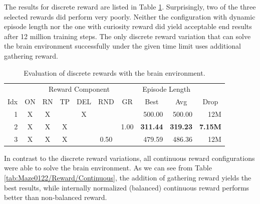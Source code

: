 The results for discrete reward are listed in Table \ref{tab:Maze0122/Reward/Discrete}. Surprisingly, two of the three selected rewards did perform very poorly. Neither the configuration with dynamic episode length nor the one with curiosity reward did yield acceptable end results after 12 million training steps. The only discrete reward variation that can solve the brain environment successfully under the given time limit uses additional gathering reward. 


\begin{table}[htp]
    \begin{center}
        \begin{tabular}{rccccccrrr}
            \toprule
             & \multicolumn{6}{c}{Reward Component} & \multicolumn{2}{c}{Episode Length} & \\
            \cmidrule(lr){2-7}\cmidrule(lr){8-9}
            \multicolumn{1}{c}{Idx} & \multicolumn{1}{c}{ON} & \multicolumn{1}{c}{RN} & \multicolumn{1}{c}{TP} & \multicolumn{1}{c}{DEL} & \multicolumn{1}{c}{RND} & \multicolumn{1}{c}{GR} & \multicolumn{1}{c}{Best} & \multicolumn{1}{c}{Avg} & \multicolumn{1}{c}{Drop}\\
            \midrule
            1 & X & X &  & X &  &  & 500.00 & 500.00 & 12M \\
            2 & X & X & X &  &  & 1.00 & \textbf{311.44} & \textbf{319.23} & \textbf{7.15M} \\
            3 & X & X & X &  & 0.50 &  & 479.59 & 486.36 & 12M \\
            \bottomrule
        \end{tabular}
    \end{center}
    \caption[Evaluation of Discrete Reward with the Brain Environment]{Evaluation of discrete rewards with the brain environment.} \label{tab:Maze0122/Reward/Discrete}
\end{table}

In contrast to the discrete reward variations, all continuous reward configurations were able to solve the brain environment. As we can see from Table \ref{tab:Maze0122/Reward/Continuous}, the addition of gathering reward yields the best results, while internally normalized (balanced) continuous reward performs better than non-balanced reward.

